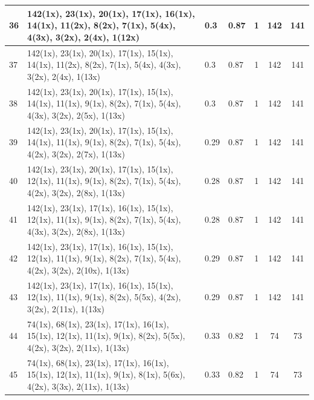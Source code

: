 \begin{small}
\begin{longtable}{|p{0.5cm}|p{9cm}|p{1.3cm}|p{1.3cm}|c|c|c|}
  36 & 142(1x), 23(1x), 20(1x), 17(1x), 16(1x), 14(1x), 11(2x), 8(2x), 7(1x), 5(4x), 4(3x), 3(2x), 2(4x), 1(12x) & \cellcolor{colorGood}  0.3 & \cellcolor{colorGood} 0.87 & 1 & 142 & \cellcolor{colorBad} 141 \\   \hline
  37 & 142(1x), 23(1x), 20(1x), 17(1x), 15(1x), 14(1x), 11(2x), 8(2x), 7(1x), 5(4x), 4(3x), 3(2x), 2(4x), 1(13x) & \cellcolor{colorGood}  0.3 & \cellcolor{colorGood} 0.87 & 1 & 142 & \cellcolor{colorBad} 141 \\   \hline
  38 & 142(1x), 23(1x), 20(1x), 17(1x), 15(1x), 14(1x), 11(1x), 9(1x), 8(2x), 7(1x), 5(4x), 4(3x), 3(2x), 2(5x), 1(13x) & \cellcolor{colorGood}  0.3 & \cellcolor{colorGood} 0.87 & 1 & 142 & \cellcolor{colorBad} 141 \\   \hline
  39 & 142(1x), 23(1x), 20(1x), 17(1x), 15(1x), 14(1x), 11(1x), 9(1x), 8(2x), 7(1x), 5(4x), 4(2x), 3(2x), 2(7x), 1(13x) & \cellcolor{colorGood}  0.29 & \cellcolor{colorGood} 0.87 & 1 & 142 & \cellcolor{colorBad} 141 \\   \hline
  40 & 142(1x), 23(1x), 20(1x), 17(1x), 15(1x), 12(1x), 11(1x), 9(1x), 8(2x), 7(1x), 5(4x), 4(2x), 3(2x), 2(8x), 1(13x) & \cellcolor{colorGood}  0.28 & \cellcolor{colorGood} 0.87 & 1 & 142 & \cellcolor{colorBad} 141 \\   \hline
  41 & 142(1x), 23(1x), 17(1x), 16(1x), 15(1x), 12(1x), 11(1x), 9(1x), 8(2x), 7(1x), 5(4x), 4(3x), 3(2x), 2(8x), 1(13x) & \cellcolor{colorGood}  0.28 & \cellcolor{colorGood} 0.87 & 1 & 142 & \cellcolor{colorBad} 141 \\   \hline
  42 & 142(1x), 23(1x), 17(1x), 16(1x), 15(1x), 12(1x), 11(1x), 9(1x), 8(2x), 7(1x), 5(4x), 4(2x), 3(2x), 2(10x), 1(13x) & \cellcolor{colorGood}  0.29 & \cellcolor{colorGood} 0.87 & 1 & 142 & \cellcolor{colorBad} 141 \\   \hline
  43 & 142(1x), 23(1x), 17(1x), 16(1x), 15(1x), 12(1x), 11(1x), 9(1x), 8(2x), 5(5x), 4(2x), 3(2x), 2(11x), 1(13x) & \cellcolor{colorGood}  0.29 & \cellcolor{colorGood} 0.87 & 1 & 142 & \cellcolor{colorBad} 141 \\   \hline
  44 & 74(1x), 68(1x), 23(1x), 17(1x), 16(1x), 15(1x), 12(1x), 11(1x), 9(1x), 8(2x), 5(5x), 4(2x), 3(2x), 2(11x), 1(13x) & \cellcolor{colorGood}  0.33 & \cellcolor{colorGood} 0.82 & 1 & 74 & \cellcolor{colorBad} 73 \\   \hline
  45 & 74(1x), 68(1x), 23(1x), 17(1x), 16(1x), 15(1x), 12(1x), 11(1x), 9(1x), 8(1x), 5(6x), 4(2x), 3(3x), 2(11x), 1(13x) & \cellcolor{colorGood}  0.33 & \cellcolor{colorGood} 0.82 & 1 & 74 & \cellcolor{colorBad} 73 \\   \hline

\end{longtable}
\end{small}
